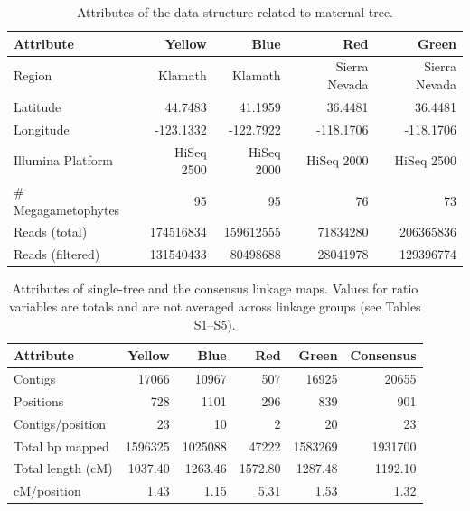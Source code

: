 \documentclass[smallextended]{svjour3}
\begin{document}
\clearpage

\begin{table}[ht]
\centering
\caption{Attributes of the data structure related to maternal tree.} 
\begin{tabular}{lrrrr}
\toprule
Attribute & Yellow & Blue & Red & Green\\
\midrule
Region & Klamath & Klamath & Sierra Nevada & Sierra Nevada \\
Latitude & 44.7483 & 41.1959 & 36.4481 & 36.4481 \\
Longitude & -123.1332 & -122.7922 & -118.1706 & -118.1706 \\
Illumina Platform & HiSeq 2500 & HiSeq 2000 & HiSeq 2000 & HiSeq 2500 \\
\# Megagametophytes & 95 & 95 & 76 & 73 \\
Reads (total) & \num{174516834} & \num{159612555} & \num{71834280} & \num{206365836} \\
Reads (filtered) & \num{131540433} & \num{80498688} & \num{28041978} & \num{129396774} \\
\bottomrule
\end{tabular}
\label{t:label}
\end{table}

\clearpage

\begin{table}[ht]
\centering
\caption{Attributes of single-tree and the consensus linkage maps. Values for 
  ratio variables are totals and are not averaged across linkage groups (see 
  Tables S1--S5).} 

\begin{tabular}{lrrrrr}
\toprule
Attribute & Yellow & Blue & Red & Green & Consensus \\
\midrule
Contigs & 17066 & 10967 & 507 & 16925 & 20655 \\
Positions & 728 & 1101 & 296 & 839 & 901 \\
Contigs/position & 23 & 10 & 2 & 20 & 23 \\
Total bp mapped & \num{1596325} & \num{1025088} & \num{47222} & \num{1583269} & \num{1931700} \\
Total length (cM) & 1037.40 & 1263.46 & 1572.80 & 1287.48 & 1192.10 \\
cM/position & 1.43 & 1.15 & 5.31 & 1.53 & 1.32 \\
\bottomrule
\end{tabular}
\label{t:label}
\end{table}

\clearpage
\end{document}
